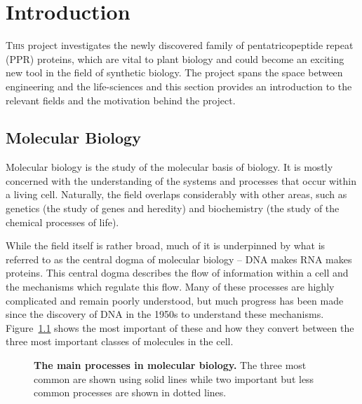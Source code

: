
\chapter{Introduction}
\label{chap:Introduction} 

\lettrine{T}{his} project investigates the newly discovered family of 
pentatricopeptide repeat (PPR) proteins, which are vital to plant biology and 
could become an exciting new tool in the field of synthetic biology.
The project spans the space between engineering and the life-sciences and this
section provides an introduction to the relevant fields and the motivation
behind the project.

\section{Molecular Biology}
\label{sec:MolecularBiology}

Molecular biology is the study of the molecular basis of biology.
It is mostly concerned with the understanding of the systems and processes
that occur within a living cell.
Naturally, the field overlaps considerably with other areas, 
such as genetics (the study of genes and heredity) and biochemistry (the study
of the chemical processes of life).

While the field itself is rather broad, much of it is underpinned by what is
referred to as the central dogma of molecular biology -- 
DNA makes RNA makes proteins.
This central dogma describes the flow of information within a cell and the
mechanisms which regulate this flow.
Many of these processes are highly complicated and remain poorly
understood, but much progress has been made since the discovery of DNA in the
1950s to understand these mechanisms.
Figure~\ref{fig:processes} shows the most important of these and how
they convert between the three most important classes of molecules in the cell.

\begin{figure}
  \centering
  \caption{\textbf{The main processes in molecular biology.} 
    The three most common are
    shown using solid lines while two important but less common processes are
    shown in dotted lines.
    \label{fig:processes}}
\end{figure}

